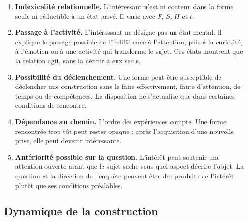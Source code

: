 \documentclass[11pt,a4paper]{article}
\begin{document}
\begin{enumerate}
  \item \textbf{Indexicalité relationnelle.} L'intéressant n'est ni contenu
        dans la forme seule ni réductible à un état privé. Il varie avec
        \(F\), \(S\), \(H\) et \(t\).
  \item \textbf{Passage à l'activité.} L'intéressant ne désigne pas un état
        mental. Il explique le passage possible de l'indifférence à l'attention,
        puis à la curiosité, à l'émotion ou à une activité qui transforme le
        sujet. Ces états montrent que la relation agit, sans la définir à eux seuls.
  \item \textbf{Possibilité du déclenchement.} Une forme peut être susceptible de
        déclencher une construction sans le faire effectivement, faute
        d'attention, de temps ou de compétences. La disposition ne s'actualise
        que dans certaines conditions de rencontre.
  \item \textbf{Dépendance au chemin.} L'ordre des expériences compte. Une
        forme rencontrée trop tôt peut rester opaque ; après l'acquisition
        d'une nouvelle prise, elle peut devenir intéressante.
  \item \textbf{Antériorité possible sur la question.} L'intérêt peut soutenir
        une attention ouverte avant que le sujet sache sous quel aspect décrire
        l'objet. La question et la direction de l'enquête peuvent être des
        produits de l'intérêt plutôt que ses conditions préalables.
\end{enumerate}

\subsection{Dynamique de la construction}
\end{document}
